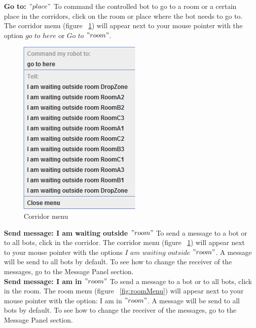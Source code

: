 \raggedright{\textbf{Go to: $"place"$}}
To command the controlled bot to go to a room or a certain place in the corridors, click on the room or place where the bot needs to go to. The corridor menu (figure ~\ref{fig:corridorMenu}) will appear next to your mouse pointer with the option $go$ $to$ $here$ or $Go$ $to$ $"room"$.\\
\begin{figure}[h]
\begin{center}
\includegraphics{NewFeatures/hpg-corridor-menu.png}
\end{center}
\caption{Corridor menu}
\label{fig:corridorMenu}
\end{figure}
\textbf{Send message: I am waiting outside $"room"$}
To send a message to a bot or to all bots, click in the corridor. The corridor menu (figure ~\ref{fig:corridorMenu}) will appear next to your mouse pointer with the options $I$ $am$ $waiting$ $outside$ $"room"$. A message will be send to all bots by default. To see how to change the receiver of the messages, go to the Message Panel section.
\\
\textbf{Send message: I am in $"room"$}
To send a message to a bot or to all bots, click in the room. The room menu (figure ~\ref{fig:roomMenu}) will appear next to your mouse pointer with the option: I am in $"room"$. A message will be send to all bots by default. To see how to change the receiver of the messages, go to the Message Panel section.
\\
